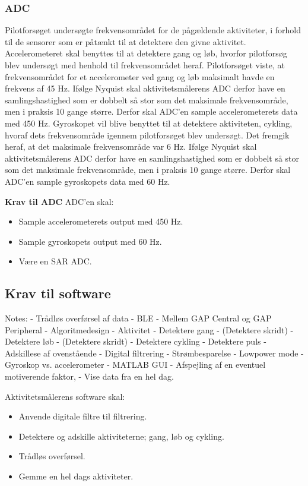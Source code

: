 \subsubsection{ADC}
Pilotforsøget undersøgte frekvensområdet for de pågældende aktiviteter, i forhold til de sensorer som er påtænkt til at detektere den givne aktivitet.\newline
Accelerometeret skal benyttes til at detektere gang og løb, hvorfor pilotforsøg blev undersøgt med henhold til frekvensområdet heraf. Pilotforsøget viste, at frekvensområdet for et accelerometer ved gang og løb maksimalt havde en frekvens af 45 Hz. Ifølge Nyquist skal aktivitetsmålerens ADC derfor have en samlingshastighed som er dobbelt så stor som det maksimale frekvensområde, men i praksis 10 gange større. Derfor skal ADC'en sample accelerometerets data med 450 Hz.\newline
Gyroskopet vil blive benyttet til at detektere aktiviteten, cykling, hvoraf dets frekvensområde igennem pilotforsøget blev undersøgt. Det fremgik heraf, at det maksimale frekvensområde var 6 Hz. Ifølge Nyquist skal aktivitetsmålerens ADC derfor have en samlingshastighed som er dobbelt så stor som det maksimale frekvensområde, men i praksis 10 gange større. Derfor skal ADC'en sample gyroskopets data med 60 Hz.

\textbf{Krav til ADC} \newline
ADC'en skal:
\begin{itemize}
\item Sample accelerometerets output med 450 Hz.
\item Sample gyroskopets output med 60 Hz. 
\item Være en SAR ADC. 
\end{itemize}



\subsection{Krav til software}

Notes: 
- Trådløs overførsel af data
	- BLE
	- Mellem GAP Central og GAP Peripheral
- Algoritmedesign 
	- Aktivitet
		- Detektere gang 
			- (Detektere skridt)
		- Detektere løb
			- (Detektere skridt)
		- Detektere cykling
		- Detektere puls 
		- Adskillese af ovenstående
		- Digital filtrering 
	- Strømbesparelse 
		- Lowpower mode
		- Gyroskop vs. accelerometer
- MATLAB GUI
	- Afspejling af en eventuel motiverende faktor, 
	- Vise data fra en hel dag. 
		

Aktivitetsmålerens software skal:
\begin{itemize}
\item Anvende digitale filtre til filtrering.
\item Detektere og adskille aktiviteterne; gang, løb og cykling. 
\item Trådløs overførsel.
\item Gemme en hel dags aktiviteter. 
\end{itemize}
